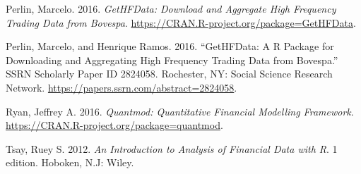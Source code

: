 \documentclass[]{article}
\begin{document}
\setlength{\parindent}{0in}

\hypertarget{refs}{}
\hypertarget{ref-perlinux5fgethfdata:ux5f2016}{}
Perlin, Marcelo. 2016. \emph{GetHFData: Download and Aggregate High
Frequency Trading Data from Bovespa}.
\url{https://CRAN.R-project.org/package=GetHFData}.

\hypertarget{ref-perlinux5fgethfdata:ux5f2016-1}{}
Perlin, Marcelo, and Henrique Ramos. 2016. ``GetHFData: A R Package for
Downloading and Aggregating High Frequency Trading Data from Bovespa.''
SSRN Scholarly Paper ID 2824058. Rochester, NY: Social Science Research
Network. \url{https://papers.ssrn.com/abstract=2824058}.

\hypertarget{ref-ryanux5fquantmod:ux5f2016}{}
Ryan, Jeffrey A. 2016. \emph{Quantmod: Quantitative Financial Modelling
Framework}. \url{https://CRAN.R-project.org/package=quantmod}.

\hypertarget{ref-tsayux5fintroductionux5f2012}{}
Tsay, Ruey S. 2012. \emph{An Introduction to Analysis of Financial Data
with R}. 1 edition. Hoboken, N.J: Wiley.
\end{document}
